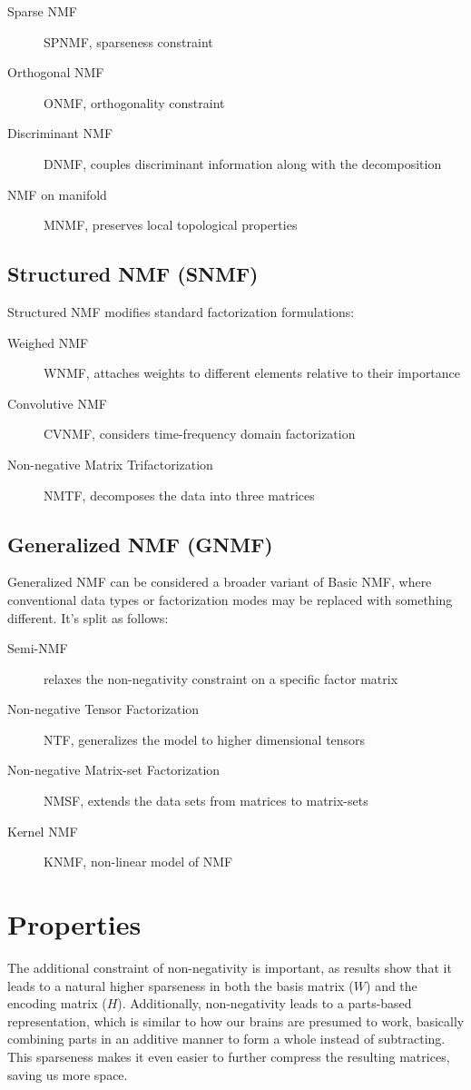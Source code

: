 \begin{description}
	\item[Sparse NMF] SPNMF, sparseness constraint
	\item[Orthogonal NMF] ONMF, orthogonality constraint
	\item[Discriminant NMF] DNMF, couples discriminant information along with the decomposition
	\item[NMF on manifold] MNMF, preserves local topological properties
\end{description}

\subsection{Structured NMF (SNMF)}
Structured NMF modifies standard factorization formulations:

\begin{description}
	\item[Weighed NMF] WNMF, attaches weights to different elements relative to their importance
	\item[Convolutive NMF] CVNMF, considers time-frequency domain factorization
	\item[Non-negative Matrix Trifactorization] NMTF, decomposes the data into three matrices
\end{description}

\subsection{Generalized NMF (GNMF)}
Generalized NMF can be considered a broader variant of Basic NMF, where conventional data types or factorization modes may be replaced with something different. It's split as follows:

\begin{description}
	\item[Semi-NMF] relaxes the non-negativity constraint on a specific factor matrix
	\item[Non-negative Tensor Factorization] NTF, generalizes the model to higher dimensional tensors
	\item[Non-negative Matrix-set Factorization] NMSF, extends the data sets from matrices to matrix-sets
	\item[Kernel NMF] KNMF, non-linear model of NMF
\end{description}

\section{Properties}
The additional constraint of non-negativity is important, as results show that it leads to a natural higher sparseness in both the basis matrix ($W$) and the encoding matrix ($H$). Additionally, non-negativity leads to a parts-based representation, which is similar to how our brains are presumed to work, basically combining parts in an additive manner to form a whole instead of subtracting. \cite{nmf_parts_objects} This sparseness makes it even easier to further compress the resulting matrices, saving us more space.

